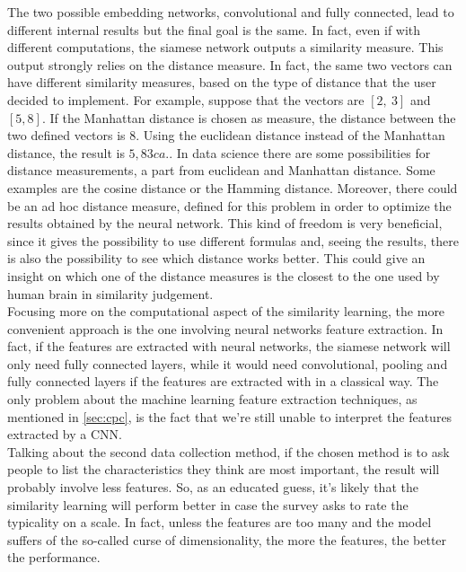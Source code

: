 \documentclass[conference]{IEEEtran}
\begin{document}
			\noindent The two possible embedding networks, convolutional and fully connected, lead to different internal results but the final goal is the same. In fact, even if with different computations, the siamese 
			network outputs a similarity measure. This output strongly relies on the distance measure. In fact, the same two vectors can have different similarity measures, based on the type of distance that the user 
			decided to implement. For example, suppose that the vectors are $[2,\ 3]$ and $[5, 8]$. If the Manhattan distance is chosen as measure, the distance between the two defined vectors is $8$. 
			Using the euclidean distance instead of the Manhattan distance, the result is $5,83 ca.$. In data science there are some possibilities for distance measurements, a part from euclidean and Manhattan distance. Some 
			examples are the cosine distance or the Hamming distance. Moreover, there could be an ad hoc distance measure, defined for this problem in order to optimize the results obtained by the neural network. 
			This kind of freedom is very beneficial, since it gives the possibility to use different formulas and, seeing the results, there is also the possibility to see which distance works better. This could give an 
			insight on which one of the distance measures is the closest to the one used by human brain in similarity judgement. \\
			Focusing more on the computational aspect of the similarity learning, the more convenient approach is the one involving neural networks feature extraction. In fact, if the features are extracted with 
			neural networks, the siamese network will only need fully connected layers, while it would need convolutional, pooling and fully connected layers if the features are extracted with in a classical way. 
			The only problem about the machine learning feature extraction techniques, as mentioned in \ref{sec:cpc}, is the fact that we're still unable to interpret the features extracted by a CNN.\\
			Talking about the second data collection method, if the chosen method is to ask people to list the characteristics they think are most important, the result will probably involve less features. So, as an 
			educated guess, it's likely that the similarity learning will perform better in case the survey asks to rate the typicality on a scale. In fact, unless the features are too many and the model suffers of the 
			so-called curse of dimensionality, the more the features, the better the performance.
			
\end{document}
